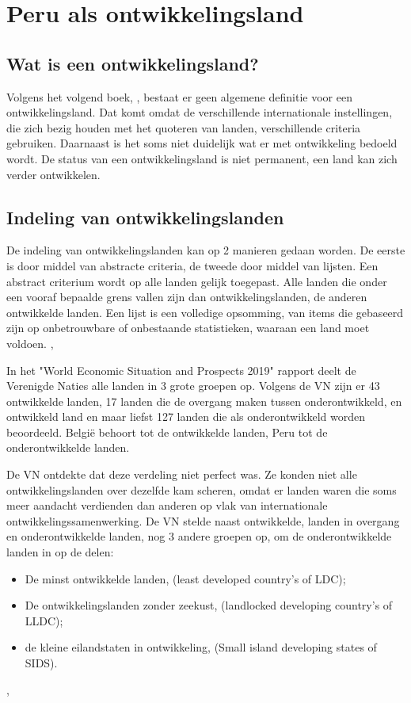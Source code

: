 \section{Peru als ontwikkelingsland}
\subsection{Wat is een ontwikkelingsland?}
Volgens het volgend boek, \autocite{MarcJ.Bossuyt2005}, bestaat er geen algemene definitie voor een ontwikkelingsland. Dat komt omdat de verschillende internationale instellingen, die zich bezig houden met het quoteren van landen, verschillende criteria gebruiken. Daarnaast is het soms niet duidelijk wat er met ontwikkeling bedoeld wordt.
De status van een ontwikkelingsland is niet permanent, een land kan zich verder ontwikkelen.

\subsection{Indeling van ontwikkelingslanden}
De indeling van ontwikkelingslanden kan op 2 manieren gedaan worden. De eerste is door middel van abstracte criteria, de tweede door middel van lijsten. Een abstract criterium wordt op alle landen gelijk toegepast. Alle landen die onder een vooraf bepaalde grens vallen zijn dan ontwikkelingslanden, de anderen ontwikkelde landen. Een lijst is een volledige opsomming, van items die gebaseerd zijn op onbetrouwbare of onbestaande statistieken, waaraan een land moet voldoen. \autocite{MarcJ.Bossuyt2005},

In het "World Economic Situation and Prospects 2019" rapport \autocite{unitednations2019} deelt de  Verenigde Naties alle landen in 3 grote groepen op. Volgens de VN zijn er 43 ontwikkelde landen, 17 landen die de overgang maken tussen onderontwikkeld, en ontwikkeld land en maar liefst 127 landen die als onderontwikkeld worden beoordeeld. België behoort tot de ontwikkelde landen, Peru tot de onderontwikkelde landen. \autocite{unitednations2019}

De VN ontdekte dat deze verdeling niet perfect was. Ze konden niet alle ontwikkelingslanden over dezelfde kam scheren, omdat er landen waren die soms meer aandacht verdienden dan anderen op vlak van internationale ontwikkelingssamenwerking. De VN stelde naast ontwikkelde, landen in overgang en onderontwikkelde landen, nog 3 andere groepen op, om de onderontwikkelde landen in op de delen: 

\begin{itemize}
\item De minst ontwikkelde landen, (least developed country's of LDC);
\item De ontwikkelingslanden zonder zeekust, (landlocked developing country's of LLDC);
\item de kleine eilandstaten in ontwikkeling, (Small island developing states of SIDS).
\end{itemize}
\autocite{MarcJ.Bossuyt2005},

